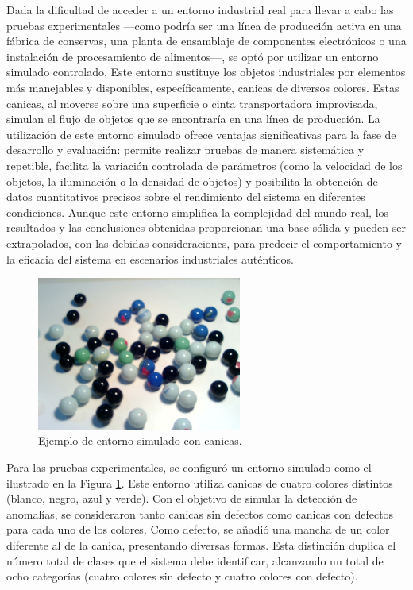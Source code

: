 \documentclass[11pt,spanish,listoffigures,listoftables]{tfgetsinf}
\begin{document}
Dada la dificultad de acceder a un entorno industrial real para llevar a cabo las pruebas experimentales —como podría ser una línea de producción activa en una fábrica de conservas, una planta de ensamblaje de componentes electrónicos o una instalación de procesamiento de alimentos—, se optó por utilizar un entorno simulado controlado. Este entorno sustituye los objetos industriales por elementos más manejables y disponibles, específicamente, canicas de diversos colores. Estas canicas, al moverse sobre una superficie o cinta transportadora improvisada, simulan el flujo de objetos que se encontraría en una línea de producción. La utilización de este entorno simulado ofrece ventajas significativas para la fase de desarrollo y evaluación: permite realizar pruebas de manera sistemática y repetible, facilita la variación controlada de parámetros (como la velocidad de los objetos, la iluminación o la densidad de objetos) y posibilita la obtención de datos cuantitativos precisos sobre el rendimiento del sistema en diferentes condiciones. Aunque este entorno simplifica la complejidad del mundo real, los resultados y las conclusiones obtenidas proporcionan una base sólida y pueden ser extrapolados, con las debidas consideraciones, para predecir el comportamiento y la eficacia del sistema en escenarios industriales auténticos.

\begin{figure}[H]
   \centering
   \includegraphics[width=0.6\textwidth]{images/diseno_e_implementacion/ejemplo_canicas.png}
   \caption{Ejemplo de entorno simulado con canicas.}
   \label{fig:entorno_simulado}
\end{figure}

Para las pruebas experimentales, se configuró un entorno simulado como el ilustrado en la Figura \ref{fig:entorno_simulado}. Este entorno utiliza canicas de cuatro colores distintos (blanco, negro, azul y verde). Con el objetivo de simular la detección de anomalías, se consideraron tanto canicas sin defectos como canicas con defectos para cada uno de los colores. Como defecto, se añadió una mancha de un color diferente al de la canica, presentando diversas formas. Esta distinción duplica el número total de clases que el sistema debe identificar, alcanzando un total de ocho categorías (cuatro colores sin defecto y cuatro colores con defecto).
\end{document}
